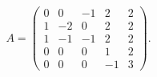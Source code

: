 \documentclass{ximera}
\begin{document}
\begin{exercise} \label{E:jnfmf}
\begin{equation*}
A = \left(\begin{array}{rrrrr} 
     0   &  0  &  -1  &   2   &  2\\
     1   & -2  &   0   &  2   &  2\\
     1   & -1  &  -1   &  2   &  2\\
     0   &  0  &   0   &  1   &  2\\
     0   &  0  &   0   & -1   &  3
 \end{array}\right). 
\end{equation*}
\end{exercise}
\end{document}
